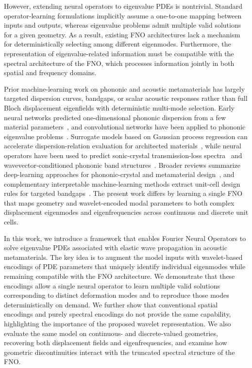\documentclass[preprint,review,12pt,numafflabel]{elsarticle}
\begin{document}
However, extending neural operators to eigenvalue PDEs is nontrivial. Standard operator-learning formulations implicitly assume a one-to-one mapping between inputs and outputs, whereas eigenvalue problems admit multiple valid solutions for a given geometry. As a result, existing FNO architectures lack a mechanism for deterministically selecting among different eigenmodes. Furthermore, the representation of eigenvalue-related information must be compatible with the spectral architecture of the FNO, which processes information jointly in both spatial and frequency domains.

Prior machine-learning work on phononic and acoustic metamaterials has largely targeted dispersion curves, bandgaps, or scalar acoustic responses rather than full Bloch displacement eigenfields with deterministic multi-mode selection. Early neural networks predicted one-dimensional phononic dispersion from a few material parameters~\cite{liu2019dispersion}, and convolutional networks have been applied to phononic eigenvalue problems~\cite{finol2019eigenvalue}. Surrogate models based on Gaussian process regression can accelerate dispersion-relation evaluation for architected materials~\cite{Ogren2024gpr}, while neural operators have been used to predict sonic-crystal transmission-loss spectra~\cite{wagner2024neural} and wavevector-conditioned phononic band structures~\cite{liu2026hybridfno}. Broader reviews summarize deep-learning approaches for phononic-crystal and metamaterial design~\cite{liu2023deeplearning,jin2022intelligent,muhammad2022ml}, and complementary interpretable machine-learning methods extract unit-cell design rules for targeted bandgaps~\cite{CHEN2022101895,Bastawrous2025}. The present work differs by learning a single FNO that maps geometry and wavelet-encoded modal parameters to both complex displacement eigenmodes and eigenfrequencies across continuous and discrete unit cells.

In this work, we introduce a framework that enables Fourier Neural Operators to solve eigenvalue PDEs associated with elastic wave propagation in acoustic metamaterials. The key idea is to augment the model inputs with wavelet-based encodings of PDE parameters that uniquely identify individual eigenmodes while remaining compatible with the FNO architecture. We demonstrate that these encodings allow a single neural operator to learn multiple valid solutions corresponding to distinct deformation modes and to reproduce those modes deterministically on demand. We further show that conventional spatial encodings and purely spectral encodings do not provide the same capability, highlighting the importance of the proposed wavelet representation. We also evaluate the same model on continuous- and discrete-valued geometries, recovering both displacement fields and eigenfrequencies, and examine how geometric discontinuities interact with the truncated spectral structure of the FNO.
\end{document}
